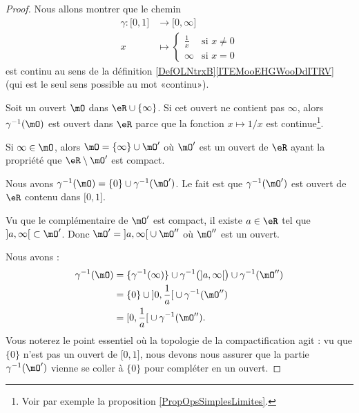 \begin{proof}
    Nous allons montrer que le chemin
    \begin{equation}
        \begin{aligned}
            \gamma\colon \mathopen[ 0 , 1 \mathclose]&\to \mathopen[ 0 , \infty \mathclose] \\
            x&\mapsto \begin{cases}
                \frac{1}{ x }    &   \text{si } x\neq 0\\
                \infty    &    \text{si } x=0
            \end{cases}
        \end{aligned}
    \end{equation}
    est continu au sens de la définition \ref{DefOLNtrxB}\ref{ITEMooEHGWooDdITRV} (qui est le seul sens possible au mot «continu»).

    Soit un ouvert \( \mO\) dans \( \eR\cup\{ \infty \}\). Si cet ouvert ne contient pas \( \infty\), alors \( \gamma^{-1}(\mO)\) est ouvert dans \( \eR\) parce que la fonction \( x\mapsto 1/x\) est continue\footnote{Voir par exemple la proposition \ref{PropOpsSimplesLimites}.}.

    Si \( \infty\in\mO\), alors \( \mO=\{ \infty \}\cup \mO'\) où \( \mO'\) est un ouvert de \( \eR\) ayant la propriété que \( \eR\setminus \mO'\) est compact.

    Nous avons \( \gamma^{-1}(\mO)=\{ 0 \}\cup\gamma^{-1}(\mO')\). Le fait est que \( \gamma^{-1}(\mO')\) est ouvert de \( \eR\) contenu dans \( \mathopen[ 0 , 1 \mathclose]\).

Vu que le complémentaire de \( \mO'\) est compact, il existe \( a\in \eR\) tel que \( \mathopen] a , \infty \mathclose[\subset \mO'\). Donc \( \mO'=\mathopen] a , \infty \mathclose[\cup\mO''\) où \( \mO''\) est un ouvert.

    Nous avons :
    \begin{subequations}
        \begin{align}
        \gamma^{-1}(\mO)&=\{ \gamma^{-1}(\infty) \}\cup \gamma^{-1}\big( \mathopen] a , \infty \mathclose[ \big)\cup \gamma^{-1}(\mO'')\\
        &=\{ 0 \}\cup\mathopen] 0 , \frac{1}{  a } \mathclose[\cup\gamma^{-1}(\mO'')\\
            &=\mathopen[ 0 , \frac{1}{ a } \mathclose[\cup\gamma^{-1}(\mO'').
        \end{align}
    \end{subequations}
    Vous noterez le point essentiel où la topologie de la compactification agit : vu que \( \{0\}\) n'est pas un ouvert de \( \mathopen[ 0 , 1 \mathclose]\), nous devons nous assurer que la partie \( \gamma^{-1}(\mO')\) vienne se coller à \( \{0\}\) pour compléter en un ouvert.


\end{proof}
